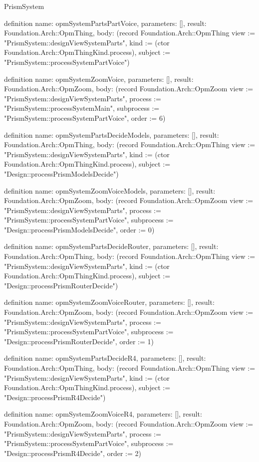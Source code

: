 \begin{lexlean}{PrismSystem}
\begin{semanticmodule}
definition{
  name: opmSystemPartsPartVoice,
  parameters: [],
  result: Foundation.Arch::OpmThing,
  body: (record Foundation.Arch::OpmThing {view := "PrismSystem::designViewSystemParts", kind := (ctor Foundation.Arch::OpmThingKind.process), subject := "PrismSystem::processSystemPartVoice"})
}

definition{
  name: opmSystemZoomVoice,
  parameters: [],
  result: Foundation.Arch::OpmZoom,
  body: (record Foundation.Arch::OpmZoom {view := "PrismSystem::designViewSystemParts", process := "PrismSystem::processSystemMain", subprocess := "PrismSystem::processSystemPartVoice", order := 6})
}

definition{
  name: opmSystemPartsDecideModels,
  parameters: [],
  result: Foundation.Arch::OpmThing,
  body: (record Foundation.Arch::OpmThing {view := "PrismSystem::designViewSystemParts", kind := (ctor Foundation.Arch::OpmThingKind.process), subject := "Design::processPrismModelsDecide"})
}

definition{
  name: opmSystemZoomVoiceModels,
  parameters: [],
  result: Foundation.Arch::OpmZoom,
  body: (record Foundation.Arch::OpmZoom {view := "PrismSystem::designViewSystemParts", process := "PrismSystem::processSystemPartVoice", subprocess := "Design::processPrismModelsDecide", order := 0})
}

definition{
  name: opmSystemPartsDecideRouter,
  parameters: [],
  result: Foundation.Arch::OpmThing,
  body: (record Foundation.Arch::OpmThing {view := "PrismSystem::designViewSystemParts", kind := (ctor Foundation.Arch::OpmThingKind.process), subject := "Design::processPrismRouterDecide"})
}

definition{
  name: opmSystemZoomVoiceRouter,
  parameters: [],
  result: Foundation.Arch::OpmZoom,
  body: (record Foundation.Arch::OpmZoom {view := "PrismSystem::designViewSystemParts", process := "PrismSystem::processSystemPartVoice", subprocess := "Design::processPrismRouterDecide", order := 1})
}

definition{
  name: opmSystemPartsDecideR4,
  parameters: [],
  result: Foundation.Arch::OpmThing,
  body: (record Foundation.Arch::OpmThing {view := "PrismSystem::designViewSystemParts", kind := (ctor Foundation.Arch::OpmThingKind.process), subject := "Design::processPrismR4Decide"})
}

definition{
  name: opmSystemZoomVoiceR4,
  parameters: [],
  result: Foundation.Arch::OpmZoom,
  body: (record Foundation.Arch::OpmZoom {view := "PrismSystem::designViewSystemParts", process := "PrismSystem::processSystemPartVoice", subprocess := "Design::processPrismR4Decide", order := 2})
}


\end{semanticmodule}
\end{lexlean}
